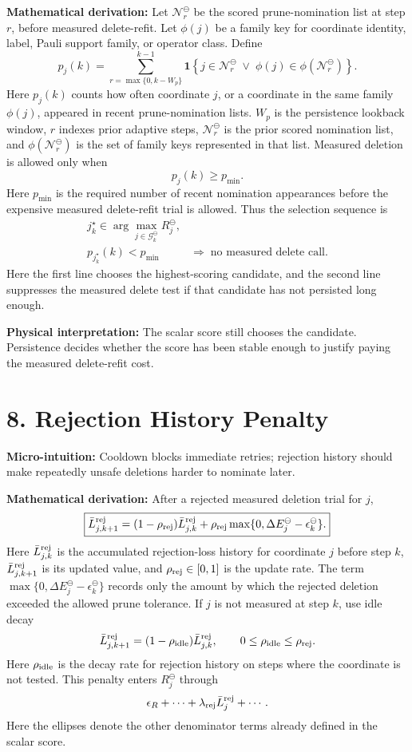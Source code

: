 \documentclass[10pt,twocolumn]{article}
\newcommand{\blk}[1]{\vspace{3pt}\noindent\textbf{#1:}\quad}
\newcommand{\Gdel}{\mathcal G_k^{\ominus}}
\newcommand{\Rdel}{R_j^{\ominus}}
\newcommand{\dEdel}{\Delta E_j^{\ominus}}
\begin{document}
\blk{Mathematical derivation}
Let \(\mathcal N_r^\ominus\) be the scored prune-nomination list at step \(r\), before measured delete-refit. Let \(\phi(j)\) be a family key for coordinate identity, label, Pauli support family, or operator class. Define
\[
\boxed{
p_j(k)
=
\sum_{r=\max\{0,k-W_p\}}^{k-1}
\mathbf 1\left\{
j\in\mathcal N_r^\ominus
\;\lor\;
\phi(j)\in\phi(\mathcal N_r^\ominus)
\right\}.
}
\]
Here \(p_j(k)\) counts how often coordinate \(j\), or a coordinate in the same family \(\phi(j)\), appeared in recent prune-nomination lists. \(W_p\) is the persistence lookback window, \(r\) indexes prior adaptive steps, \(\mathcal N_r^\ominus\) is the prior scored nomination list, and \(\phi(\mathcal N_r^\ominus)\) is the set of family keys represented in that list.
Measured deletion is allowed only when
\[
\boxed{
p_j(k)\ge p_{\min}.
}
\]
Here \(p_{\min}\) is the required number of recent nomination appearances before the expensive measured delete-refit trial is allowed.
Thus the selection sequence is
\[
\begin{aligned}
j_k^\star\in\arg\max_{j\in\Gdel}\Rdel,
\\
p_{j_k^\star}(k)<p_{\min}
\;&\Rightarrow\;
\text{no measured delete call}.
\end{aligned}
\]
Here the first line chooses the highest-scoring candidate, and the second line suppresses the measured delete test if that candidate has not persisted long enough.

\blk{Physical interpretation}
The scalar score still chooses the candidate. Persistence decides whether the score has been stable enough to justify paying the measured delete-refit cost.

\section*{8. Rejection History Penalty}

\blk{Micro-intuition}
Cooldown blocks immediate retries; rejection history should make repeatedly unsafe deletions harder to nominate later.

\blk{Mathematical derivation}
After a rejected measured deletion trial for \(j\),
\[
\boxed{
\bar L_{j,k+1}^{\rm rej}
=
(1-\rho_{\rm rej})\bar L_{j,k}^{\rm rej}
+\rho_{\rm rej}
\max\{0,\dEdel-\epsilon_k^\ominus\}.
}
\]
Here \(\bar L_{j,k}^{\rm rej}\) is the accumulated rejection-loss history for coordinate \(j\) before step \(k\), \(\bar L_{j,k+1}^{\rm rej}\) is its updated value, and \(\rho_{\rm rej}\in[0,1]\) is the update rate. The term \(\max\{0,\dEdel-\epsilon_k^\ominus\}\) records only the amount by which the rejected deletion exceeded the allowed prune tolerance.
If \(j\) is not measured at step \(k\), use idle decay
\[
\bar L_{j,k+1}^{\rm rej}
=
(1-\rho_{\rm idle})\bar L_{j,k}^{\rm rej},
\qquad
0\le\rho_{\rm idle}\le\rho_{\rm rej}.
\]
Here \(\rho_{\rm idle}\) is the decay rate for rejection history on steps where the coordinate is not tested.
This penalty enters \(R_j^\ominus\) through
\[
\epsilon_R+\cdots+\lambda_{\rm rej}\bar L_j^{\rm rej}+\cdots.
\]
Here the ellipses denote the other denominator terms already defined in the scalar score.
\end{document}

